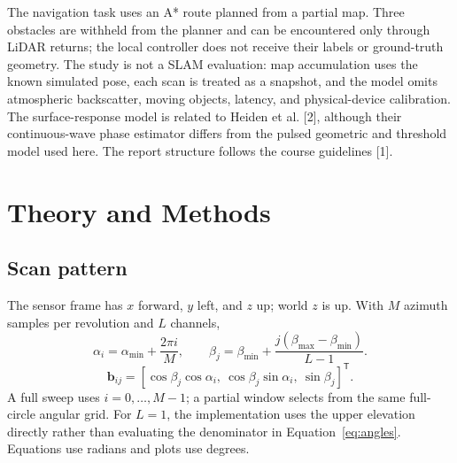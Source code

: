 \documentclass[11pt,letterpaper]{article}
\newcommand{\vect}[1]{\mathbf #1}
\begin{document}
The navigation task uses an A* route planned from a partial map. Three obstacles are withheld from the planner and can be encountered only through LiDAR returns; the local controller does not receive their labels or ground-truth geometry. The study is not a SLAM evaluation: map accumulation uses the known simulated pose, each scan is treated as a snapshot, and the model omits atmospheric backscatter, moving objects, latency, and physical-device calibration. The surface-response model is related to Heiden et al. [2], although their continuous-wave phase estimator differs from the pulsed geometric and threshold model used here. The report structure follows the course guidelines [1].

\section{Theory and Methods}\label{sec:theory}
\subsection{Scan pattern}
The sensor frame has $x$ forward, $y$ left, and $z$ up; world $z$ is up. With $M$ azimuth samples per revolution and $L$ channels,
\begin{equation}\label{eq:angles}
\alpha_i=\alpha_{\min}+\frac{2\pi i}{M},\qquad
\beta_j=\beta_{\min}+\frac{j(\beta_{\max}-\beta_{\min})}{L-1}.
\end{equation}
\begin{equation}\label{eq:beam}
\vect b_{ij}=[\cos\beta_j\cos\alpha_i,\ \cos\beta_j\sin\alpha_i,\ \sin\beta_j]^{\mathsf T}.
\end{equation}
A full sweep uses $i=0,\ldots,M-1$; a partial window selects from the same full-circle angular grid. For $L=1$, the implementation uses the upper elevation directly rather than evaluating the denominator in Equation~\eqref{eq:angles}. Equations use radians and plots use degrees.
\end{document}
